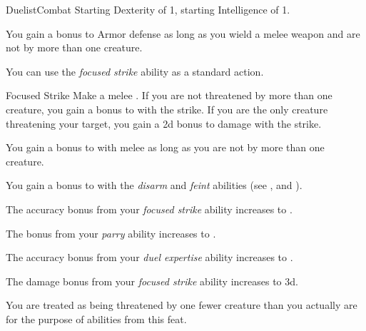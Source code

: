     \begin{feat}{Duelist}{Combat}
        \featpre Starting Dexterity of 1, starting Intelligence of 1.

         You gain a  bonus to Armor defense as long as you wield a melee weapon and are not  by more than one creature.

         You can use the \textit{focused strike} ability as a standard action.
        \begin{apability}{Focused Strike}
            Make a melee .
            If you are not threatened by more than one creature, you gain a  bonus to  with the strike.
            If you are the only creature threatening your target, you gain a \plus2d bonus to damage with the strike.
        \end{apability}

         You gain a  bonus to  with melee  as long as you are not  by more than one creature.

         You gain a  bonus to  with the \textit{disarm} and \textit{feint} abilities (see , and ).

         The accuracy bonus from your \textit{focused strike} ability increases to .

         The bonus from your \textit{parry} ability increases to .

         The accuracy bonus from your \textit{duel expertise} ability increases to .

         The damage bonus from your \textit{focused strike} ability increases to \plus3d.

         You are treated as being threatened by one fewer creature than you actually are for the purpose of abilities from this feat.
    \end{feat}

